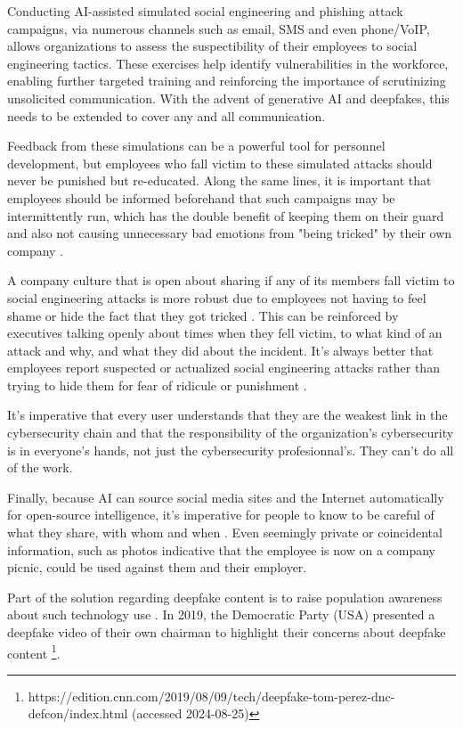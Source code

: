 Conducting AI-assisted simulated social engineering and phishing attack campaigns, via numerous channels such as email, SMS and even phone/VoIP, allows organizations to assess the suspectibility of their employees to social engineering tactics. These exercises help identify vulnerabilities in the workforce, enabling further targeted training and reinforcing the importance of scrutinizing unsolicited communication. With the advent of generative AI and deepfakes, this needs to be extended to cover any and all communication.

Feedback from these simulations can be a powerful tool for personnel development, but employees who fall victim to these simulated attacks should never be punished but re-educated. Along the same lines, it is important that employees should be informed beforehand that such campaigns may be intermittently run, which has the double benefit of keeping them on their guard and also not causing unnecessary bad emotions from "being tricked" by their own company \citep{hadnagySocialEngineering2018, mitnickArtDeceptionControlling2003}.

A company culture that is open about sharing if any of its members fall victim to social engineering attacks is more robust due to employees not having to feel shame or hide the fact that they got tricked \citep{hadnagySocialEngineering2018}. This can be reinforced by executives talking openly about times when they fell victim, to what kind of an attack and why, and what they did about the incident. It's always better that employees report suspected or actualized social engineering attacks rather than trying to hide them for fear of ridicule or punishment \citep{mitnickArtDeceptionControlling2003}.

It's imperative that every user understands that they are the weakest link in the cybersecurity chain \citep{mitnickArtDeceptionControlling2003} and that the responsibility of the organization's cybersecurity is in everyone's hands, not just the cybersecurity profesionnal's. They can't do all of the work.


Finally, because AI can source social media sites and the Internet automatically for open-source intelligence, it's imperative for people to know to be careful of what they share, with whom and when \citep{mitnickArtDeceptionControlling2003}. Even seemingly private or coincidental information, such as photos indicative that the employee is now on a company picnic, could be used against them and their employer.

Part of the solution regarding deepfake content is to raise population awareness about such technology use \citep{blauthArtificialIntelligenceCrime2022}. In 2019, the Democratic Party (USA) presented a deepfake video of their own chairman to highlight their concerns about deepfake content \footnote{https://edition.cnn.com/2019/08/09/tech/deepfake-tom-perez-dnc-defcon/index.html (accessed 2024-08-25)}.